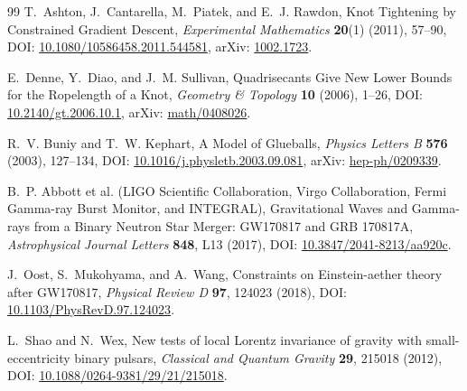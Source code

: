 \documentclass[11pt]{article}
\theoremstyle{definition}
\theoremstyle{plain}
\theoremstyle{remark}
\begin{document}
\begin{thebibliography}{99}
            T.~Ashton, J.~Cantarella, M.~Piatek, and E.~J. Rawdon,
            \newblock Knot Tightening by Constrained Gradient Descent,
            \newblock \emph{Experimental Mathematics} \textbf{20}(1) (2011), 57--90,
            \newblock DOI: \href{https://doi.org/10.1080/10586458.2011.544581}{10.1080/10586458.2011.544581},
            \newblock arXiv: \href{https://arxiv.org/abs/1002.1723}{1002.1723}.

            E.~Denne, Y.~Diao, and J.~M. Sullivan,
            \newblock Quadrisecants Give New Lower Bounds for the Ropelength of a Knot,
            \newblock \emph{Geometry \& Topology} \textbf{10} (2006), 1--26,
            \newblock DOI: \href{https://doi.org/10.2140/gt.2006.10.1}{10.2140/gt.2006.10.1},
            \newblock arXiv: \href{https://arxiv.org/abs/math/0408026}{math/0408026}.

            R.~V. Buniy and T.~W. Kephart,
            \newblock A Model of Glueballs,
            \newblock \emph{Physics Letters B} \textbf{576} (2003), 127--134,
            \newblock DOI: \href{https://doi.org/10.1016/j.physletb.2003.09.081}{10.1016/j.physletb.2003.09.081},
            \newblock arXiv: \href{https://arxiv.org/abs/hep-ph/0209339}{hep-ph/0209339}.

            B.~P. Abbott et al. (LIGO Scientific Collaboration, Virgo Collaboration, Fermi Gamma-ray Burst Monitor, and INTEGRAL),
            \newblock Gravitational Waves and Gamma-rays from a Binary Neutron Star Merger: GW170817 and GRB 170817A,
            \newblock \emph{Astrophysical Journal Letters} \textbf{848}, L13 (2017),
            \newblock DOI: \href{https://doi.org/10.3847/2041-8213/aa920c}{10.3847/2041-8213/aa920c}.

            J.~Oost, S.~Mukohyama, and A.~Wang,
            \newblock Constraints on Einstein-aether theory after GW170817,
            \newblock \emph{Physical Review D} \textbf{97}, 124023 (2018),
            \newblock DOI: \href{https://doi.org/10.1103/PhysRevD.97.124023}{10.1103/PhysRevD.97.124023}.

            L.~Shao and N.~Wex,
            \newblock New tests of local Lorentz invariance of gravity with small-eccentricity binary pulsars,
            \newblock \emph{Classical and Quantum Gravity} \textbf{29}, 215018 (2012),
            \newblock DOI: \href{https://doi.org/10.1088/0264-9381/29/21/215018}{10.1088/0264-9381/29/21/215018}.


\end{thebibliography}
\end{document}
